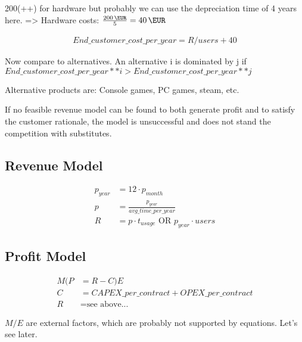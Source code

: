 200(++) for hardware but probably we can use the depreciation time of 4 years here. 
=> Hardware costs: $ \frac{\SI{200}{\EUR}}{5}  = \SI{40}{\EUR}$

\begin{align}
End\_customer\_cost\_per\_year = R/users + 40
\end{align}

Now compare to alternatives. An alternative i is dominated by j if $End\_customer\_cost\_per\_year ** i > End\_customer\_cost\_per\_year ** j$

Alternative products are: Console games, PC games, steam, etc.

If no feasible revenue model can be found to both generate profit and to satisfy the customer rationale, the model is unsuccessful and does not stand the competition with substitutes.



\subsection{Revenue Model}

\begin{align*}
p_{year} &= 12 \cdot p_{month} \\
p &= \frac{p_{year}}{avg\_time\_per\_year} \\
R &= p  \cdot t_{usage} \text{ OR } p_{year} \cdot users
\end{align*}


\subsection{Profit Model}

\begin{align*}
M(P & =R-C)E \\
C &= CAPEX\_per\_contract + OPEX\_per\_contract \\
R &= \text{see above...}
\end{align*}

$M / E$ are external factors, which are probably not supported by equations. Let's see later.












